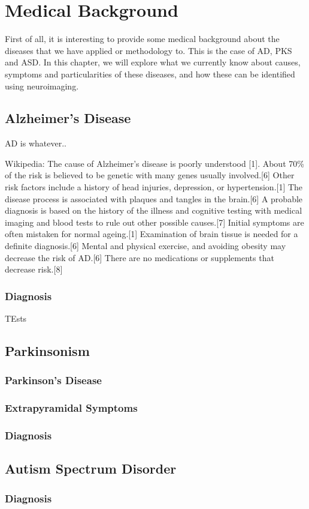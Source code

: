 \chapter{Medical Background}\label{ch:medicine}

First of all, it is interesting to provide some medical background about the diseases that we have applied or methodology to. This is the case of \ac{AD}, \ac{PKS} and \ac{ASD}. In this chapter, we will explore what we currently know about causes, symptoms and particularities of these diseases, and how these can be identified using neuroimaging. 

\section{Alzheimer's Disease}
\ac{AD} is whatever.. 

Wikipedia: The cause of Alzheimer's disease is poorly understood [1]. About 70\% of the risk is believed to be genetic with many genes usually involved.[6] Other risk factors include a history of head injuries, depression, or hypertension.[1] The disease process is associated with plaques and tangles in the brain.[6] A probable diagnosis is based on the history of the illness and cognitive testing with medical imaging and blood tests to rule out other possible causes.[7] Initial symptoms are often mistaken for normal ageing.[1] Examination of brain tissue is needed for a definite diagnosis.[6] Mental and physical exercise, and avoiding obesity may decrease the risk of AD.[6] There are no medications or supplements that decrease risk.[8]
\subsection{Diagnosis}
TEsts

\section{Parkinsonism}
\subsection{Parkinson's Disease}
\subsection{Extrapyramidal Symptoms}
\subsection{Diagnosis}

\section{Autism Spectrum Disorder}
\subsection{Diagnosis}

